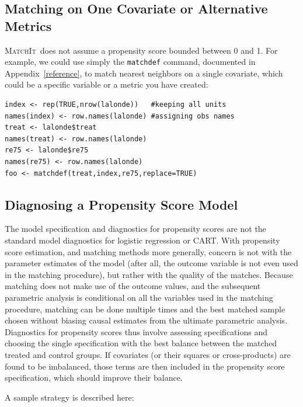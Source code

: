 \documentclass[oneside,letterpaper,titlepage]{article}
\newcommand{\MatchIt}{\textsc{MatchIt}}
\begin{document}
\subsection{Matching on One Covariate or Alternative Metrics}
\MatchIt\ does not assume a propensity score bounded between 0 and 1.
For example, we could use simply the \texttt{matchdef} command,
documented in Appendix~\ref{reference}, to match nearest neighbors on
a single covariate, which could be a specific variable or a metric you
have created:

\begin{verbatim}
index <- rep(TRUE,nrow(lalonde))   #keeping all units
names(index) <- row.names(lalonde) #assigning obs names
treat <- lalonde$treat
names(treat) <- row.names(lalonde)
re75 <- lalonde$re75
names(re75) <- row.names(lalonde)
foo <- matchdef(treat,index,re75,replace=TRUE)
\end{verbatim}

\subsection{Diagnosing a Propensity Score Model}
\label{pscorespec}
The model specification and diagnostics for propensity scores are not
the standard model diagnostics for logistic regression or CART.  With
propensity score estimation, and matching methods more generally,
concern is not with the parameter estimates of the model (after all,
the outcome variable is not even used in the matching procedure), but
rather with the quality of the matches.  Because matching does not
make use of the outcome values, and the subsequent parametric analysis
is conditional on all the variables used in the matching procedure,
matching can be done multiple times and the best matched sample chosen
without biasing causal estimates from the ultimate parametric
analysis.  Diagnostics for propensity scores thus involve assessing
specifications and choosing the single specification with the best
balance between the matched treated and control groups.  If covariates
(or their squares or cross-products) are found to be imbalanced, those
terms are then included in the propensity score specification, which
should improve their balance.  

A sample strategy is described here:
\end{document}
